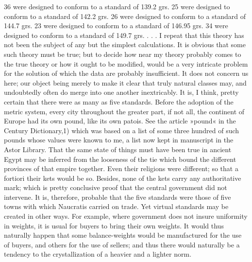 36 were designed to conform to a standard of 139.2 grs.
25 were designed to conform to a standard of 142.2 grs.
26 were designed to conform to a standard of 144.7 grs.
23 were designed to conform to a standard of 146.95 grs.
34 were designed to conform to a standard of 149.7 grs.
. . . I repeat that this theory has not been the subject of any but the simplest calculations. It is obvious that some such theory must be true; but to decide how near my theory probably comes to the true theory or how it ought to be modified, would be a very intricate problem for the solution of which the data are probably insufficient. It does not concern us here; our object being merely to make it clear that truly natural classes may, and undoubtedly often do merge into one another inextricably.
It is, I think, pretty certain that there were as many as five standards. Before the adoption of the metric system, every city throughout the greater part, if not all, the continent of Europe had its own pound, like its own patois. See the article »pound« in the Century Dictionary,1) which was based on a list of some three hundred of such pounds whose values were known to me, a list now kept in manuscript in the Astor Library. That the same state of things must have been true in ancient Egypt may be inferred from the looseness of the tie which bound the different provinces of that empire together. Even their religions were different; so that a fortiori their kets would be so. Besides, none of the kets carry any authoritative mark; which is pretty conclusive proof that the central government did not intervene. It is, therefore, probable that the five standards were those of five towns with which Naucratis carried on trade. Yet virtual standards may be created in other ways. For example, where government does not insure uniformity in weights, it is usual for buyers to bring their own weights. It would thus naturally happen that some balance-weights would be manufactured for the use of buyers, and others for the use of sellers; and thus there would naturally be a tendency to the crystallization of a heavier and a lighter norm.
